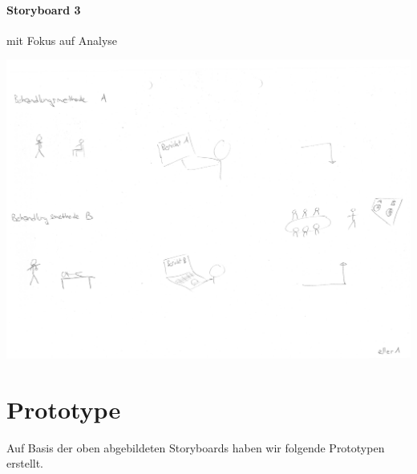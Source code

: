 \documentclass[a4paper]{scrreprt}
\begin{document}
\pagebreak

\paragraph{Storyboard 3} mit Fokus auf Analyse

\includegraphics[width=1\textwidth]{storyboards_personas_prototypes/iteration3/eller1_storyboard2.png}

\pagebreak
\section{Prototype}
Auf Basis der oben abgebildeten Storyboards haben wir folgende Prototypen erstellt.
\end{document}

